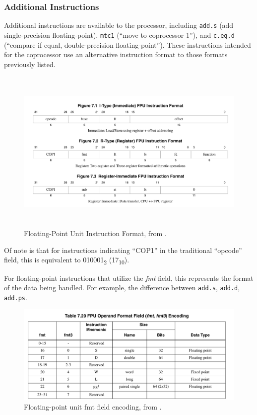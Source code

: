 \documentclass[
    paper=letter,
    parskip=half,
    fontsize=12pt,
    titlepage=firstiscover,
    toc=bibliography,
    numbers=endperiod
]{scrartcl}
\begin{document}

\subsubsection{Additional Instructions}

Additional instructions are available to the processor, including
\texttt{add.s} (add single-precision floating-point), \texttt{mtc1}
(``move to coprocessor 1''), and \texttt{c.eq.d} (``compare if equal,
double-precision floating-point''). These instructions intended for the
coprocessor use an alternative instruction format to those formats
previously listed.

\begin{figure}[H]
    \includegraphics[height=8cm]{fpu-instruction-formats}
    \caption{Floating-Point Unit Instruction Format, from \protect\cite{mips-specification}.}
\end{figure}

Of note is that for instructions indicating ``COP1'' in the traditional
``opcode'' field, this is equivalent to 010001\textsubscript{2}
(17\textsubscript{10}).

For floating-point instructions that utilize the \emph{fmt} field, this
represents the format of the data being handled. For example, the
difference between \texttt{add.s}, \texttt{add.d}, \texttt{add.ps}.

\begin{figure}[H]
    \includegraphics[width=\textwidth]{fpu-fmt-encoding}
    \caption{Floating-point unit fmt field encoding, from \protect\cite[Table~7.20]{mips-specification}.}
\end{figure}
\end{document}

